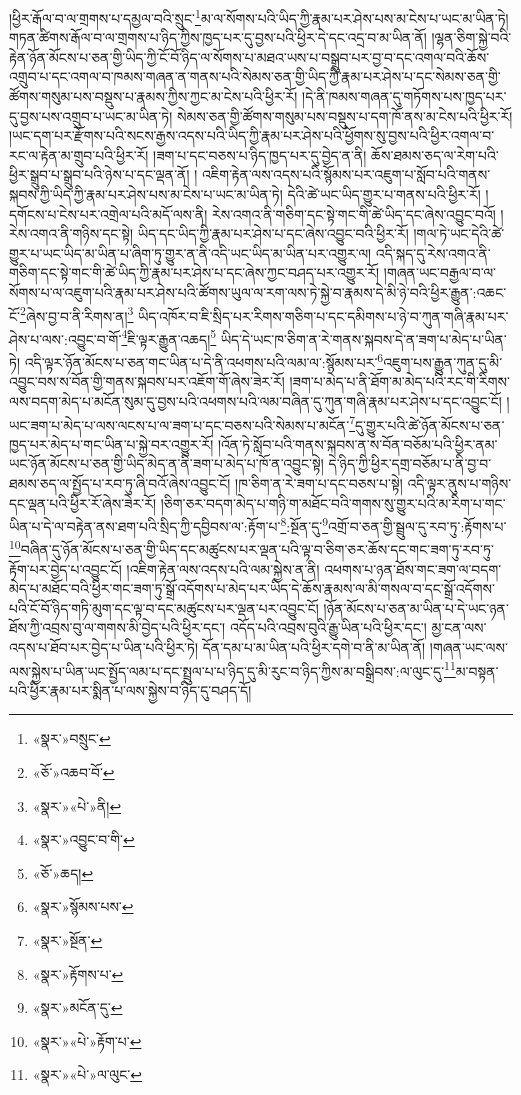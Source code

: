 །ཕྱིར་རྒོལ་བ་ལ་གྲགས་པ་དམྱལ་བའི་སྲུང་\footnote{«སྣར་»བསྲུང་}མ་ལ་སོགས་པའི་ཡིད་ཀྱི་རྣམ་པར་ཤེས་པས་མ་ངེས་པ་ཡང་མ་ཡིན་ཏེ། གཏན་ཚིགས་རྒོལ་བ་ལ་གྲགས་པ་ཉིད་ཀྱིས་ཁྱད་པར་དུ་བྱས་པའི་ཕྱིར་དེ་དང་འདྲ་བ་མ་ཡིན་ནོ། །ལྷན་ཅིག་སྐྱེ་བའི་རྟེན་ཉོན་མོངས་པ་ཅན་གྱི་ཡིད་ཀྱི་ངོ་བོ་ཉིད་ལ་སོགས་པ་མཐའ་ཡས་པ་བསྒྲུབ་པར་བྱ་བ་དང་འགལ་བའི་ཆོས་འགྲུབ་པ་དང་འགལ་བ་ཁམས་གཞན་ན་གནས་པའི་སེམས་ཅན་གྱི་ཡིད་ཀྱི་རྣམ་པར་ཤེས་པ་དང་སེམས་ཅན་གྱི་ཚོགས་གསུམ་པས་བསྡུས་པ་རྣམས་ཀྱིས་ཀྱང་མ་ངེས་པའི་ཕྱིར་རོ། །དེ་ནི་ཁམས་གཞན་དུ་གཏོགས་པས་ཁྱད་པར་དུ་བྱས་པས་འགྲུབ་པ་ཡང་མ་ཡིན་ཏེ། སེམས་ཅན་གྱི་ཚོགས་གསུམ་པས་བསྡུས་པ་དག་ཁོ་ནས་མ་ངེས་པའི་ཕྱིར་རོ། །ཡང་དག་པར་རྫོགས་པའི་སངས་རྒྱས་འདས་པའི་ཡིད་ཀྱི་རྣམ་པར་ཤེས་པའི་ཕྱོགས་སུ་བྱས་པའི་ཕྱིར་འགལ་བ་རང་ལ་རྟེན་མ་གྲུབ་པའི་ཕྱིར་རོ། །ཟག་པ་དང་བཅས་པ་ཉིད་ཁྱད་པར་དུ་བྱེད་ན་ནི། ཆོས་ཐམས་ཅད་ལ་རེག་པའི་ཕྱིར་སྒྲུབ་པ་སྒྲུབ་པའི་ཉེས་པ་དང་ལྡན་ནོ། །
འཇིག་རྟེན་ལས་འདས་པའི་སྙོམས་པར་འཇུག་པ་སློབ་པའི་གནས་སྐབས་ཀྱི་ཡིད་ཀྱི་རྣམ་པར་ཤེས་པས་མ་ངེས་པ་ཡང་མ་ཡིན་ཏེ། དེའི་ཚེ་ཡང་ཡིད་གྱུར་པ་གནས་པའི་ཕྱིར་རོ། །དགོངས་པ་ངེས་པར་འགྲེལ་པའི་མདོ་ལས་ནི། རེས་འགའ་ནི་གཅིག་དང་སྟེ་གང་གི་ཚེ་ཡིད་དང་ཞེས་འབྱུང་བའོ། །རེས་འགའ་ནི་གཉིས་དང་སྟེ། ཡིད་དང་ཡིད་ཀྱི་རྣམ་པར་ཤེས་པ་དང་ཞེས་འབྱུང་བའི་ཕྱིར་རོ། །གལ་ཏེ་ཡང་དེའི་ཚེ་གྱུར་པ་ཡང་ཡིད་མ་ཡིན་པ་ཞིག་ཏུ་གྱུར་ན་ནི་འདི་ཡང་ཡིད་མ་ཡིན་པར་འགྱུར་ལ། འདི་སྐད་དུ་རེས་འགའ་ནི་གཅིག་དང་སྟེ་གང་གི་ཚེ་ཡིད་ཀྱི་རྣམ་པར་ཤེས་པ་དང་ཞེས་ཀྱང་བཤད་པར་འགྱུར་རོ། །གཞན་ཡང་བརྒྱལ་བ་ལ་སོགས་པ་ལ་འཇུག་པའི་རྣམ་པར་ཤེས་པའི་ཚོགས་ཡུལ་ལ་རག་ལས་ཏེ་སྐྱེ་བ་རྣམས་དེ་མི་ཉེ་བའི་ཕྱིར་རྒྱུན་:འཆང་ངོ་\footnote{«ཅོ་»འཆབ་བོ་}ཞེས་བྱ་བ་ནི་རིགས་ན།\footnote{«སྣར་»«པེ་»ནི།} ཡིད་འཁོར་བ་ཇི་སྲིད་པར་རིགས་གཅིག་པ་དང་དམིགས་པ་ཉེ་བ་ཀུན་གཞི་རྣམ་པར་ཤེས་པ་ལས་:འབྱུང་བ་གོ་\footnote{«སྣར་»འབྱུང་བ་གི་}ཇི་ལྟར་རྒྱུན་འཆད།\footnote{«ཅོ་»ཆད།} ཡིད་དེ་ཡང་ཁ་ཅིག་ན་རེ་གནས་སྐབས་དེ་ན་ཟག་པ་མེད་པ་ཡིན་ཏེ། འདི་ལྟར་ཉོན་མོངས་པ་ཅན་གང་ཡིན་པ་དེ་ནི་འཕགས་པའི་ལམ་ལ་:སྙོམས་པར་\footnote{«སྣར་»སྙོམས་པས་}འཇུག་པས་རྒྱུན་ཀུན་དུ་མི་འབྱུང་བས་ས་བོན་གྱི་གནས་སྐབས་པར་འཇོག་གོ་ཞེས་ཟེར་རོ། །ཟག་པ་མེད་པ་ནི་ཐོག་མ་མེད་པའི་རང་གི་རིགས་ལས་བདག་མེད་པ་མངོན་སུམ་དུ་བྱས་པའི་འཕགས་པའི་ལམ་བཞིན་དུ་ཀུན་གཞི་རྣམ་པར་ཤེས་པ་དང་འབྱུང་ངོ། །ཡང་ཟག་པ་མེད་པ་ལས་ལངས་པ་ལ་ཟག་པ་དང་བཅས་པའི་སེམས་པ་མངོན་\footnote{«སྣར་»སྔོན་}དུ་གྱུར་པའི་ཚེ་ཉོན་མོངས་པ་ཅན་ཁྱད་པར་མེད་པ་གང་ཡིན་པ་སྐྱེ་བར་འགྱུར་རོ། །འོན་ཏེ་སློབ་པའི་གནས་སྐབས་ན་ས་བོན་བཅོམ་པའི་ཕྱིར་ནམ་ཡང་ཉོན་མོངས་པ་ཅན་གྱི་ཡིད་མེད་ན་ནི་ཟག་པ་མེད་པ་ཁོ་ན་འབྱུང་སྟེ། དེ་ཉིད་ཀྱི་ཕྱིར་དགྲ་བཅོམ་པ་ནི་བྱ་བ་ཐམས་ཅད་ལ་སྤྱོད་པ་རབ་ཏུ་ཞི་བའོ་ཞེས་འབྱུང་ངོ། །ཁ་ཅིག་ན་རེ་ཟག་པ་དང་བཅས་པ་སྟེ། འདི་ལྟར་ནུས་པ་གཉིས་དང་ལྡན་པའི་ཕྱིར་རོ་ཞེས་ཟེར་རོ། །ཅིག་ཅར་བདག་མེད་པ་གཉི་ག་མཐོང་བའི་གགས་སུ་གྱུར་པའི་མ་རིག་པ་གང་ཡིན་པ་དེ་ལ་བརྟེན་ནས་ཐག་པའི་སྲིད་ཀྱི་དབྱིབས་ལ་:རྟོག་པ་\footnote{«སྣར་»རྟོགས་པ་}:སྔོན་དུ་\footnote{«སྣར་»མངོན་དུ་}འགྲོ་བ་ཅན་གྱི་སྦྲུལ་དུ་རབ་ཏུ་:རྟོགས་པ་\footnote{«སྣར་»«པེ་»རྟོག་པ་}བཞིན་དུ་ཉོན་མོངས་པ་ཅན་གྱི་ཡིད་དང་མཚུངས་པར་ལྡན་པའི་ལྟ་བ་ཅིག་ཅར་ཆོས་དང་གང་ཟག་ཏུ་རབ་ཏུ་རྟོག་པར་བྱེད་པ་འབྱུང་ངོ། །འཇིག་རྟེན་ལས་འདས་པའི་ལམ་སྐྱེས་ན་ནི། འཕགས་པ་ཉན་ཐོས་གང་ཟག་ལ་བདག་མེད་པ་མཐོང་བའི་ཕྱིར་གང་ཟག་ཏུ་སྒྲོ་འདོགས་པ་མེད་པར་ཡིད་དེ་ཆོས་རྣམས་ལ་མི་གསལ་བ་དང་སྒྲོ་འདོགས་པའི་ངོ་བོ་ཉིད་གཏི་མུག་དང་ལྟ་བ་དང་མཚུངས་པར་ལྡན་པར་འབྱུང་ངོ། །ཉོན་མོངས་པ་ཅན་མ་ཡིན་པ་དེ་ཡང་ཉན་ཐོས་ཀྱི་འབྲས་བུ་ལ་གགས་མི་བྱེད་པའི་ཕྱིར་དང་། འདོད་པའི་འབྲས་བུའི་རྒྱུ་ཡིན་པའི་ཕྱིར་དང་། མྱ་ངན་ལས་འདས་པ་ཐོབ་པར་བྱེད་པ་ཡིན་པའི་ཕྱིར་ཏེ། དོན་དམ་པ་མ་ཡིན་པའི་ཕྱིར་དགེ་བ་ནི་མ་ཡིན་ནོ། །གཞན་ཡང་ལས་ལས་སྐྱེས་པ་ཡིན་ཡང་སྤྱོད་ལམ་པ་དང་སྤྲུལ་པ་པ་ཉིད་དུ་མི་རུང་བ་ཉིད་ཀྱིས་མ་བསྒྲིབས་:ལ་ལུང་དུ་\footnote{«སྣར་»«པེ་»ལ་ལུང་}མ་བསྟན་པའི་ཕྱིར་རྣམ་པར་སྨིན་པ་ལས་སྐྱེས་བ་ཉིད་དུ་བཤད་དོ། 